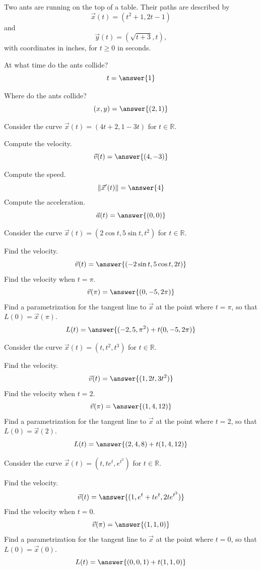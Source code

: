 \documentclass{ximera}
\begin{document}
\begin{problem}
Two ants are running on the top of a table. Their paths are described by
\[
\vec{x}(t) = (t^2+1,2t-1)
\]
and
\[
\vec{y}(t) = (\sqrt{t+3}, t),
\]
with coordinates in inches, for $t\geq 0$ in seconds.

At what time do the ants collide?
\[
t = \answer{1}
\]

Where do the ants collide?
\[
(x,y) = \answer{(2,1)}
\]
\end{problem}

\begin{problem}
Consider the curve $\vec{x}(t) = (4t+2, 1-3t)$ for $t\in\mathbb{R}$.

Compute the velocity.
\[
\vec{v}(t) = \answer{(4,-3)}
\]

Compute the speed.
\[
\|\vec{x}'(t)\| = \answer{4}
\]
Compute the acceleration.
\[
\vec{a}(t) = \answer{(0,0)}
\]
\end{problem}

\begin{problem}
Consider the curve $\vec{x}(t) = (2\cos t, 5\sin t, t^2)$ for $t\in\mathbb{R}$.

Find the velocity.
\[
\vec{v}(t) = \answer{(-2\sin t, 5\cos t, 2t)}
\]
Find the velocity when $t = \pi$.
\[
\vec{v}(\pi) = \answer{(0,-5,2\pi)}
\]
Find a parametrization for the tangent line to $\vec{x}$ at the point where $t = \pi$, so that $L(0) = \vec{x}(\pi)$.
\[
L(t) = \answer{(-2,5,\pi^2) + t(0,-5,2\pi)}
\]
\end{problem}

\begin{problem}
Consider the curve $\vec{x}(t) = (t, t^2, t^3)$ for $t\in\mathbb{R}$.

Find the velocity.
\[
\vec{v}(t) = \answer{(1, 2t, 3t^2)}
\]
Find the velocity when $t = 2$.
\[
\vec{v}(\pi) = \answer{(1,4,12)}
\]
Find a parametrization for the tangent line to $\vec{x}$ at the point where $t = 2$, so that $L(0) = \vec{x}(2)$.
\[
L(t) = \answer{(2,4,8) + t(1,4,12)}
\]
\end{problem}

\begin{problem}
Consider the curve $\vec{x}(t) = (t, te^t, e^{t^2})$ for $t\in\mathbb{R}$.

Find the velocity.
\[
\vec{v}(t) = \answer{(1, e^t+te^t, 2te^{t^2})}
\]
Find the velocity when $t = 0$.
\[
\vec{v}(\pi) = \answer{(1,1,0)}
\]
Find a parametrization for the tangent line to $\vec{x}$ at the point where $t = 0$, so that $L(0) = \vec{x}(0)$.
\[
L(t) = \answer{(0,0,1) + t(1,1,0)}
\]
\end{problem}
\end{document}
